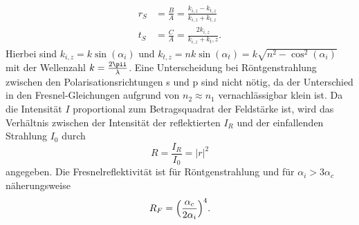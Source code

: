 \begin{align}
  r_S&=\frac{B}{A}=\frac{k_{i,z}-k_{t,z}}{k_{i,z}+k_{t,z}}\\
  t_S&=\frac{C}{A}=\frac{2k_{i,z}}{k_{i,z}+k_t,z}.
\end{align}
Hierbei sind $k_{i,z}=k\sin(\alpha_i)$ und $k_{t,z}=nk\sin(\alpha_t)=k\sqrt{n^2-\cos^2(\alpha_i)}$ mit der Wellenzahl $k=\frac{2\pii}{\lambda}$. Eine Unterscheidung bei Röntgenstrahlung zwischen den Polarisationsrichtungen s und p sind nicht nötig, da der Unterschied in den Fresnel-Gleichungen aufgrund von $n_2\approx n_1$ vernachlässigbar klein ist.
Da die Intensität $I$ proportional zum Betragsquadrat der Feldstärke ist, wird das Verhältnis zwischen der Intensität der reflektierten $I_R$ und der einfallenden Strahlung $I_0$ durch
\begin{equation}
  R=\frac{I_R}{I_0}=|r|^2
\end{equation}
angegeben. Die Fresnelreflektivität ist für Röntgenstrahlung und für $\alpha_i>3\alpha_c$ näherungsweise
\begin{equation}
  R_F=\Bigl(\frac{\alpha_c}{2\alpha_i}\Bigr)^4.
\end{equation}
